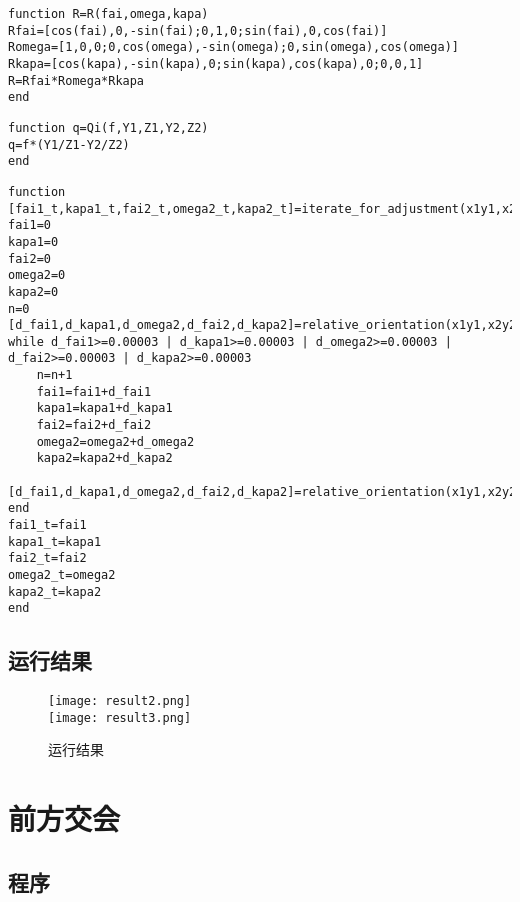 \begin{lstlisting}[caption=R.m]
function R=R(fai,omega,kapa)
Rfai=[cos(fai),0,-sin(fai);0,1,0;sin(fai),0,cos(fai)]
Romega=[1,0,0;0,cos(omega),-sin(omega);0,sin(omega),cos(omega)]
Rkapa=[cos(kapa),-sin(kapa),0;sin(kapa),cos(kapa),0;0,0,1]
R=Rfai*Romega*Rkapa
end
\end{lstlisting}

\begin{lstlisting}[caption=Qi.m]
function q=Qi(f,Y1,Z1,Y2,Z2)
q=f*(Y1/Z1-Y2/Z2)
end
\end{lstlisting}

\begin{lstlisting}[caption=iterate\_for\_adjustment.m]
function [fai1_t,kapa1_t,fai2_t,omega2_t,kapa2_t]=iterate_for_adjustment(x1y1,x2y2,f)
fai1=0
kapa1=0
fai2=0
omega2=0
kapa2=0
n=0
[d_fai1,d_kapa1,d_omega2,d_fai2,d_kapa2]=relative_orientation(x1y1,x2y2,f,fai1,kapa1,fai2,omega2,kapa2)
while d_fai1>=0.00003 | d_kapa1>=0.00003 | d_omega2>=0.00003 | d_fai2>=0.00003 | d_kapa2>=0.00003
    n=n+1
    fai1=fai1+d_fai1
    kapa1=kapa1+d_kapa1
    fai2=fai2+d_fai2
    omega2=omega2+d_omega2
    kapa2=kapa2+d_kapa2
    [d_fai1,d_kapa1,d_omega2,d_fai2,d_kapa2]=relative_orientation(x1y1,x2y2,f,fai1,kapa1,fai2,omega2,kapa2)
end
fai1_t=fai1
kapa1_t=kapa1
fai2_t=fai2
omega2_t=omega2
kapa2_t=kapa2
end    
\end{lstlisting}

\subsection{运行结果}

\begin{figure}[htbp]
\caption{运行结果}
\centering
\texttt{[image: result2.png]} \\
\texttt{[image: result3.png]}
\end{figure}

\section{前方交会}

\subsection{程序}

